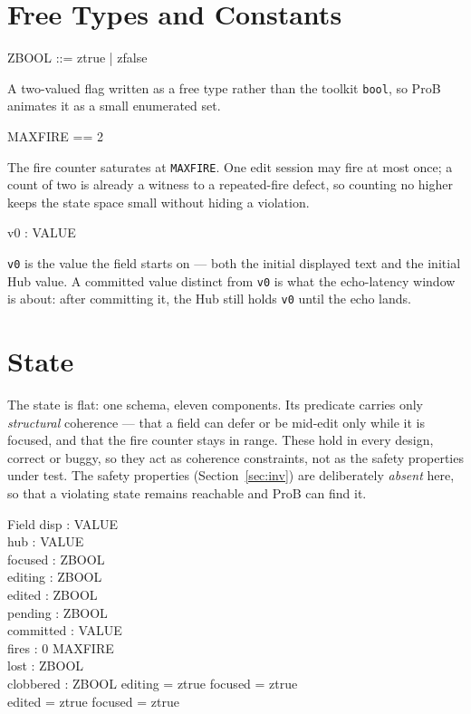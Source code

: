 \documentclass[a4paper,10pt,fleqn]{article}
\begin{document}
\section{Free Types and Constants}

\begin{zed}
  ZBOOL ::= ztrue | zfalse
\end{zed}

A two-valued flag written as a free type rather than the toolkit \texttt{bool},
so ProB animates it as a small enumerated set.

\begin{zed}
  MAXFIRE == 2
\end{zed}

The fire counter saturates at \texttt{MAXFIRE}.  One edit session may fire at
most once; a count of two is already a witness to a repeated-fire defect, so
counting no higher keeps the state space small without hiding a violation.

\begin{axdef}
  v0 : VALUE
\end{axdef}

\texttt{v0} is the value the field starts on --- both the initial displayed text
and the initial Hub value.  A committed value distinct from \texttt{v0} is what
the echo-latency window is about: after committing it, the Hub still holds
\texttt{v0} until the echo lands.

\section{State}

The state is flat: one schema, eleven components.  Its predicate carries only
\emph{structural} coherence --- that a field can defer or be mid-edit only while
it is focused, and that the fire counter stays in range.  These hold in every
design, correct or buggy, so they act as coherence constraints, not as the
safety properties under test.  The safety properties (Section~\ref{sec:inv}) are
deliberately \emph{absent} here, so that a violating state remains reachable and
ProB can find it.

\begin{schema}{Field}
  disp : VALUE \\
  hub : VALUE \\
  focused : ZBOOL \\
  editing : ZBOOL \\
  edited : ZBOOL \\
  pending : ZBOOL \\
  committed : VALUE \\
  fires : 0 \upto MAXFIRE \\
  lost : ZBOOL \\
  clobbered : ZBOOL
\where
  editing = ztrue \implies focused = ztrue \\
  edited = ztrue \implies focused = ztrue
\end{schema}
\end{document}
